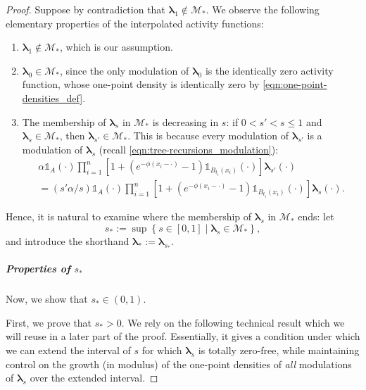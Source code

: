 \documentclass[11pt]{article}
\newcommand{\bl}{\bm{\lambda}}
\newcommand{\set}[1]{\left\{#1\right\}}
\newcommand{\indicator}[1]{\mathds{1}_{#1}}
\numberwithin{equation}{section}
\theoremstyle{plain}
\theoremstyle{definition}
\theoremstyle{remark}
\begin{document}
\begin{proof}
Suppose by contradiction that $\bl_{1}\not\in\mathcal{M}_{\ast}$.
We observe the following elementary properties of the interpolated activity functions:
\begin{enumerate}
\item $\bl_{1}\not\in\mathcal{M}_{\ast}$, which is our assumption.
\item $\bl_{0}\in\mathcal{M}_{\ast}$, since the only modulation of $\bl_{0}$ is the identically zero activity function, whose one-point density is identically zero by \eqref{eqn:one-point-densities_def}.
\item The membership of $\bl_{s}$ in $\mathcal{M}_{\ast}$ is decreasing in $s$: if $0<s'<s\le 1$ and $\bl_{s}\in\mathcal{M}_{\ast}$, then $\bl_{s'}\in\mathcal{M}_{\ast}$.
This is because every modulation of $\bl_{s'}$ is a modulation of $\bl_{s}$ (recall \eqref{eqn:tree-recursions_modulation}):
\begin{equation}
\begin{multlined}
\alpha\indicator{A}(\cdot)\prod_{i=1}^{n}\left[1+(e^{-\phi(x_{i}-\cdot)}-1)\indicator{B_{t_{i}}(x_{i})}(\cdot)\right]\bl_{s'}(\cdot)
\\
=(s'\alpha/s)\indicator{A}(\cdot)\prod_{i=1}^{n}\left[1+(e^{-\phi(x_{i}-\cdot)}-1)\indicator{B_{t_{i}}(x_{i})}(\cdot)\right]\bl_{s}(\cdot).
\end{multlined}
\end{equation}
\end{enumerate} 
Hence, it is natural to examine where the membership of $\bl_{s}$ in $\mathcal{M}_{\ast}$ ends: let
\begin{equation}
\label{eqn:zero-freeness_supremum}
s_{\ast}:=\sup\set{s\in[0,1]\mid\bl_{s}\in\mathcal{M}_{\ast}},
\end{equation}
and introduce the shorthand $\bl_{*}:=\bl_{s_{\ast}}$.

\subparagraph{Properties of $s_{\ast}$}

Now, we show that $s_{\ast}\in(0,1)$.

First, we prove that $s_{\ast}>0$.
We rely on the following technical result which we will reuse in a later part of the proof.
Essentially, it gives a condition under which we can extend the interval of $s$ for which $\bl_{s}$ is totally zero-free, while maintaining control on the growth (in modulus) of the one-point densities of \emph{all} modulations of $\bl_{s}$ over the extended interval.


\end{proof}
\end{document}
